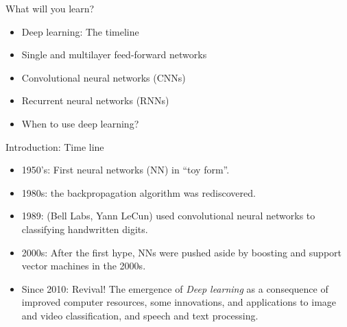 \documentclass[
  10pt,
  ignorenonframetext,
  twocolumn]{beamer}
\providecommand{\tightlist}{%
  \setlength{\itemsep}{0pt}\setlength{\parskip}{0pt}}
\begin{document}
\begin{frame}
\begin{block}{What will you learn?}
\label{what-will-you-learn}
\(~\)

\begin{itemize}
\tightlist
\item
  Deep learning: The timeline
\end{itemize}

\vspace{2mm}

\begin{itemize}
\tightlist
\item
  Single and multilayer feed-forward networks
\end{itemize}

\vspace{2mm}

\begin{itemize}
\tightlist
\item
  Convolutional neural networks (CNNs)
\end{itemize}

\vspace{2mm}

\begin{itemize}
\tightlist
\item
  Recurrent neural networks (RNNs)
\end{itemize}

\vspace{2mm}

\begin{itemize}
\tightlist
\item
  When to use deep learning?
\end{itemize}
\end{block}
\end{frame}

\begin{frame}{Introduction: Time line}
\label{introduction-time-line}
\(~\)

\begin{itemize}
\item
  1950's: First neural networks (NN) in ``toy form''.
\item
  1980s: the backpropagation algorithm was rediscovered.
\item
  1989: (Bell Labs, Yann LeCun) used convolutional neural networks to
  classifying handwritten digits.
\item
  2000s: After the first hype, NNs were pushed aside by boosting and
  support vector machines in the 2000s.
\item
  Since 2010: Revival! The emergence of \emph{Deep learning} as a
  consequence of improved computer resources, some innovations, and
  applications to image and video classification, and speech and text
  processing.
\end{itemize}

\(~\)
\end{frame}
\end{document}
